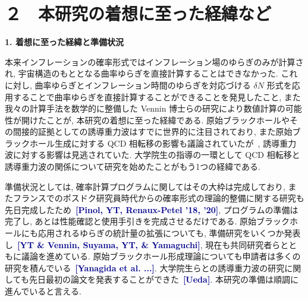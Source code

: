 \documentclass[11pt,a4paper,uplatex,dvipdfmx]{ujarticle} 		%
\newcommand{\研究課題名}{確率解析・原始ブラックホール・重力波観測から迫るインフレーション}
\newcommand{\研究機関名}{名古屋大学}
\newcommand{\研究代表者氏名}{多田祐一郎}
\newcommand{\研究期間の最終元号年度}{6}  %
\newcommand{\Blue}[1]{\textcolor{darkblue}{\sffamily\gtfamily\bfseries #1}}
\begin{document}




\section{２　本研究の着想に至った経緯など}

		
\begin{mdframed}[roundcorner=0.5zw,
	innertopmargin=0.8zw,innerbottommargin=0.8zw,
	linecolor=black!50,linewidth=0.2zw,
	backgroundcolor=black!10]
	{\bfseries\gtfamily\sffamily\large 1. 着想に至った経緯と準備状況}
\end{mdframed}

\noindent
本来インフレーションの確率形式ではインフレーション場のゆらぎのみが計算され, 宇宙構造のもととなる曲率ゆらぎを直接計算することはできなかった.
これに対し, 曲率ゆらぎとインフレーション時間のゆらぎを対応づける $\delta N$ 形式を応用することで曲率ゆらぎを直接計算することができることを発見したこと,
また我々の計算手法を数学的に整備した Vennin 博士らの研究により数値計算の可能性が開けたことが, 本研究の着想に至った経緯である.
原始ブラックホールやその間接的証拠としての誘導重力波はすでに世界的に注目されており,
また原始ブラックホール生成に対する QCD 相転移の影響も議論されていたが~\cite{Byrnes:2018clq},
誘導重力波に対する影響は見逃されていた.
大学院生の指導の一環として QCD 相転移と誘導重力波の関係について研究を始めたことがもう1つの経緯である.

準備状況としては, 確率計算プログラムに関してはその大枠は完成しており, 
またフランスでのポスドク研究員時代からの確率形式の理論的整備に関する研究も先日完成したため~\Blue{[Pinol, YT, Renaux-Petel '18, '20]},
プログラムの準備は完了し, あとは性能確認と使用手引きを完成させるだけである.
原始ブラックホールにも応用されるゆらぎの統計量の拡張についても, 準備研究をいくつか発表し~\Blue{[YT \& Vennin, Suyama, YT, \& Yamaguchi]},
現在も共同研究者らとともに議論を進めている.
原始ブラックホール形成理論についても申請者は多くの研究を積んでいる~\Blue{[Yanagida et al. ...]}.
大学院生らとの誘導重力波の研究に関しても先日最初の論文を発表することができた~\Blue{[Ueda]}.
本研究の準備は順調に進んでいると言える.
\end{document}
